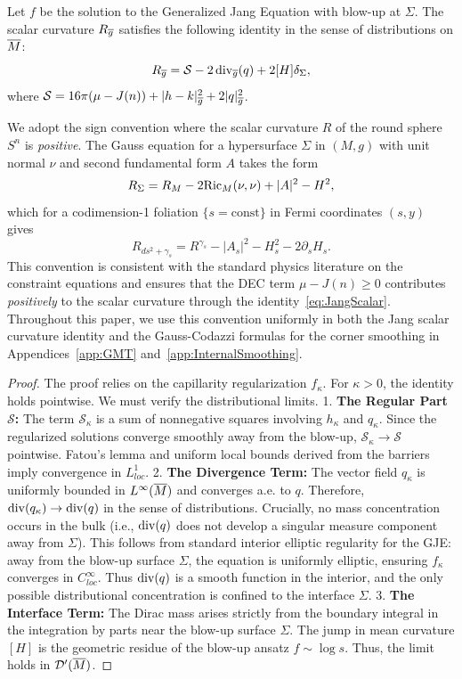 \begin{lemma}\label{lem:JangScalar}
Let $f$ be the solution to the Generalized Jang Equation with blow-up at $\Sigma$. The scalar curvature $R_{\overline{g}}$ satisfies the following identity in the sense of distributions on $\overline{M}$:
\begin{equation}\label{eq:JangScalar}
    R_{\overline{g}} = \mathcal{S} - 2 \, \mathrm{div}_{\overline{g}}(q) + 2[H]\delta_\Sigma,
\end{equation}
where $\mathcal{S} = 16\pi(\mu - J(n)) + |h - k|_{\overline{g}}^2 + 2|q|_{\overline{g}}^2$.

\begin{remark}\label{rem:SignConventionScalar}
We adopt the sign convention where the scalar curvature $R$ of the round sphere $S^n$ is \emph{positive}. The Gauss equation for a hypersurface $\Sigma$ in $(M,g)$ with unit normal $\nu$ and second fundamental form $A$ takes the form
\[
    R_\Sigma = R_M - 2\mathrm{Ric}_M(\nu,\nu) + |A|^2 - H^2,
\]
which for a codimension-1 foliation $\{s = \text{const}\}$ in Fermi coordinates $(s,y)$ gives
\[
    R_{ds^2 + \gamma_s} = R^{\gamma_s} - |A_s|^2 - H_s^2 - 2\partial_s H_s.
\]
This convention is consistent with the standard physics literature on the constraint equations and ensures that the DEC term $\mu - J(n) \ge 0$ contributes \emph{positively} to the scalar curvature through the identity~\eqref{eq:JangScalar}. Throughout this paper, we use this convention uniformly in both the Jang scalar curvature identity and the Gauss-Codazzi formulas for the corner smoothing in Appendices~\ref{app:GMT} and~\ref{app:InternalSmoothing}.
\end{remark}

\begin{proof}
The proof relies on the capillarity regularization $f_\kappa$. For $\kappa > 0$, the identity holds pointwise. We must verify the distributional limits.
1. \textbf{The Regular Part $\mathcal{S}$:} The term $\mathcal{S}_\kappa$ is a sum of nonnegative squares involving $h_\kappa$ and $q_\kappa$. Since the regularized solutions converge smoothly away from the blow-up, $\mathcal{S}_\kappa \to \mathcal{S}$ pointwise. Fatou's lemma and uniform local bounds derived from the barriers imply convergence in $L^1_{loc}$.
2. \textbf{The Divergence Term:} The vector field $q_\kappa$ is uniformly bounded in $L^\infty(\overline{M})$ and converges a.e. to $q$. Therefore, $\mathrm{div}(q_\kappa) \to \mathrm{div}(q)$ in the sense of distributions. Crucially, no mass concentration occurs in the bulk (i.e., $\mathrm{div}(q)$ does not develop a singular measure component away from $\Sigma$). This follows from standard interior elliptic regularity for the GJE: away from the blow-up surface $\Sigma$, the equation is uniformly elliptic, ensuring $f_\kappa$ converges in $C^\infty_{loc}$. Thus $\mathrm{div}(q)$ is a smooth function in the interior, and the only possible distributional concentration is confined to the interface $\Sigma$.
3. \textbf{The Interface Term:} The Dirac mass arises strictly from the boundary integral in the integration by parts near the blow-up surface $\Sigma$. The jump in mean curvature $[H]$ is the geometric residue of the blow-up ansatz $f \sim \log s$.
Thus, the limit holds in $\mathcal{D}'(\overline{M})$.
\end{proof}
\end{lemma}
